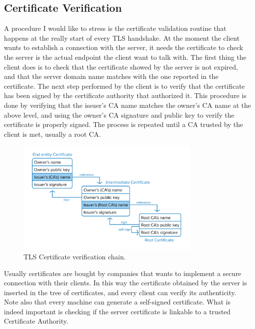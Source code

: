 		\subsection{Certificate Verification}
		\label{subsec:certificate_verification}
			\par A procedure I would like to stress is the certificate validation routine that happens at the really start of every TLS handshake. At the moment the client wants to establish a connection with the server, it needs the certificate to check the server is the actual endpoint the client want to talk with. The first thing the client does is to check that the certificate showed by the server is not expired, and that the server domain name matches with the one reported in the certificate. The next step performed by the client is to verify that the certificate has been signed by the certificate authority that authorized it. This procedure is done by verifying that the issuer's CA name matches the owner's CA name at the above level, and using the owner's CA signature and public key to verify the certificate is properly signed. The process is repeated until a CA trusted by the client is met, usually a root CA.
			\begin{figure}[ht]
				\centering
				\includegraphics[width=0.8\textwidth]{images/tls-certificate-verification.png}
				\caption{TLS Certificate verification chain. \cite{image_tls_certificate_verification}}
				\label{fig:tls_certificate_verification}
			\end{figure}
			\par Usually certificates are bought by companies that wants to implement a secure connection with their clients. In this way the certificate obtained by the server is inserted in the tree of certificates, and every client can verify its authenticity. Note also that every machine can generate a self-signed certificate. What is indeed important is checking if the server certificate is linkable to a trusted Certificate Authority. \newline
